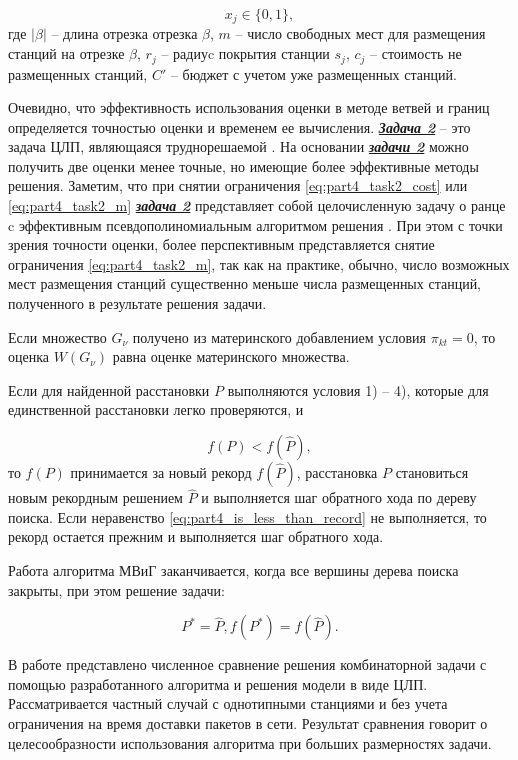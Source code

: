 \begin{displaymath}
    x_j \in \{0, 1\},
\end{displaymath}
где $|\beta|$ -- длина отрезка отрезка  $\beta$, $m$ -- число свободных мест для размещения станций на отрезке $\beta$, $r_j$ -- радиуc покрытия станции $s_j$, $c_j$ -- стоимость не размещенных станций, $C'$ -- бюджет с учетом уже размещенных станций.

Очевидно, что эффективность использования оценки в методе ветвей и границ определяется точностью оценки и временем ее вычисления. \underline{\textit{\textbf{Задача 2}}} -- это задача ЦЛП, являющаяся труднорешаемой \cite{Gari}. На основании \underline{\textit{\textbf{задачи 2}}} можно получить две оценки менее точные, но имеющие более эффективные методы решения. Заметим, что при снятии ограничения \cref{eq:part4_task2_cost} или \cref{eq:part4_task2_m} \underline{\textit{\textbf{задача 2}}} представляет собой целочисленную задачу о ранце c эффективным псевдополиномиальным алгоритмом решения \cite{Gari}. При этом с точки зрения точности оценки, более перспективным представляется снятие ограничения \cref{eq:part4_task2_m}, так как на практике, обычно, число возможных мест размещения станций существенно меньше числа размещенных станций, полученного в результате решения задачи. 

Если множество $G_\nu$ получено из материнского добавлением условия $\pi_{kt}=0$, то оценка $W(G_\nu)$ равна оценке материнского множества.

Если для найденной расстановки $P$ выполняются условия 1) – 4), которые для единственной расстановки легко проверяются, и

\begin{equation}
    \label{eq:part4_is_less_than_record}
    f(P) < f(\widehat{P}),
\end{equation}
то $f(P)$ принимается за новый рекорд $f(\widehat{P})$, расстановка $P$ становиться новым рекордным решением $\widehat{P}$ и выполняется шаг обратного хода по дереву поиска. Если неравенство \cref{eq:part4_is_less_than_record} не выполняется, то рекорд остается прежним и выполняется шаг обратного хода.

Работа алгоритма МВиГ заканчивается, когда все вершины дерева поиска закрыты, при этом решение задачи: 

\begin{displaymath}
    P^{*} = \widehat{P},  f(P^*) = f(\widehat{P}).
\end{displaymath}

В работе представлено численное сравнение решения комбинаторной задачи с помощью разработанного алгоритма и решения модели в виде ЦЛП. Рассматривается частный случай с однотипными станциями и без учета ограничения на время доставки пакетов в сети. Результат сравнения говорит о целесообразности использования алгоритма при больших размерностях задачи.


